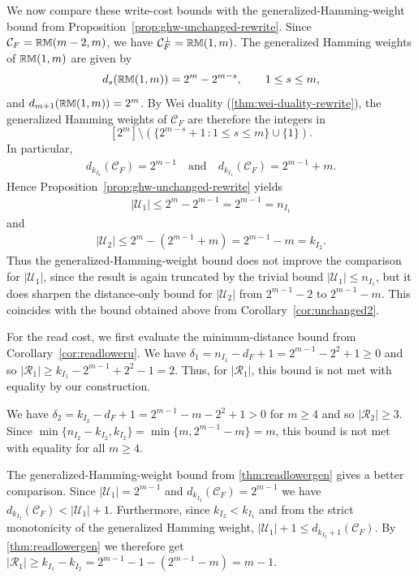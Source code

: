 \documentclass[conference, 10pt]{IEEEtran}
\theoremstyle{plain}
\theoremstyle{definition}
\newcommand{\RM}{{\text{\small $\mathbb{RM}$}}}
\newcommand{\mC}{\mathcal{C}}
\newcommand{\mU}{\mathcal{U}}
\newcommand{\mR}{\mathcal{R}}
\begin{document}
We now compare these write-cost bounds with the generalized-Hamming-weight bound from Proposition~\ref{prop:ghw-unchanged-rewrite}. Since $\mC_F=\RM(m-2,m)$, we have $\mC_F^\perp=\RM(1,m)$. The generalized Hamming weights of $\RM(1,m)$ are given by
\begin{align*}
    d_s(\RM(1,m))=2^m-2^{m-s}, \qquad 1\le s\le m,
\end{align*}
and $d_{m+1}(\RM(1,m))=2^m$. By Wei duality (\cref{thm:wei-duality-rewrite}), the generalized Hamming weights of $\mC_F$ are therefore the integers in $$[2^m] \setminus (\{2^{m-s} +1\, : 1 \leq s \leq m\} \cup \{1\}).$$
In particular,
\begin{align*}
    d_{k_{I_2}}(\mC_F)=2^{m-1} \quad \text{and} \quad d_{k_{I_1}}(\mC_F)=2^{m-1}+m.
\end{align*}
Hence Proposition~\ref{prop:ghw-unchanged-rewrite} yields
\begin{align*}
    |\mU_1|\le 2^m-2^{m-1}=2^{m-1}=n_{I_1}
\end{align*}
and
\begin{align*}
    |\mU_2|\le 2^m-(2^{m-1}+m)=2^{m-1}-m=k_{I_2}.
\end{align*}
Thus the generalized-Hamming-weight bound does not improve the comparison for $|\mU_1|$, since the result is again truncated by the trivial bound $|\mU_1|\le n_{I_1}$, but it does sharpen the distance-only bound for $|\mU_2|$ from $2^{m-1}-2$ to $2^{m-1}-m$. This coincides with the bound obtained above from Corollary~\ref{cor:unchanged2}.

For the read cost, we first evaluate the minimum-distance bound from Corollary~\ref{cor:readloweru}. We have $\delta_1 = n_{I_1}-d_F+1=2^{m-1}-2^2+1 \ge 0$ and so $|\mR_1| \ge k_{I_1}-2^{m-1}+2^2-1=2$. Thus, for $|\mR_1|$, this bound is not met with equality by our construction.

We have $\delta_2 = k_{I_2}-d_F+1=2^{m-1}-m-2^2+1 > 0$ for $m \ge 4$ and so $|\mR_2| \ge 3$. Since $\min\{n_{I_2}-k_{I_2},k_{I_2}\}=\min\{m,2^{m-1}-m\}=m$, this bound is not met with equality for all $m\ge 4$.

The generalized-Hamming-weight bound from \cref{thm:readlowergen} gives a better comparison. Since $|\mU_1|=2^{m-1}$ and $d_{k_{I_2}}(\mC_F)=2^{m-1}$ we have  $d_{k_{I_2}}(\mC_F) < |\mU_1| +1$. Furthermore, since $k_{I_2} < k_{I_1}$ and from the strict monotonicity of the generalized Hamming weight, $|\mU_1| + 1 \leq d_{k_{I_2}+1}(\mC_F)$. By \cref{thm:readlowergen} we therefore get
$|\mR_1| \geq k_{I_1} - k_{I_2} = 2^{m-1} - 1 - (2^{m-1} -m) = m-1$.
\end{document}
